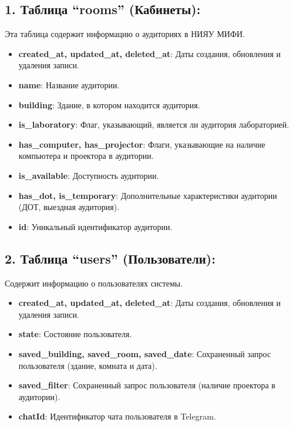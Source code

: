 \subsection*{1. Таблица ``rooms'' (Кабинеты):}
Эта таблица содержит информацию о аудиториях в НИЯУ МИФИ.
\begin{itemize}
    \item \textbf{created\_at, updated\_at, deleted\_at}: Даты создания,
обновления и удаления записи.
    \item \textbf{name}: Название аудитории.
    \item \textbf{building}: Здание, в котором находится аудитория.
    \item \textbf{is\_laboratory}: Флаг, указывающий, является ли аудитория
лабораторией.
    \item \textbf{has\_computer, has\_projector}: Флаги, указывающие на наличие
компьютера и проектора в аудитории.
    \item \textbf{is\_available}: Доступность аудитории.
    \item \textbf{has\_dot, is\_temporary}: Дополнительные характеристики
аудитории (ДОТ, выездная аудитория).
    \item \textbf{id}: Уникальный идентификатор аудитории.
\end{itemize}

\subsection*{2. Таблица ``users'' (Пользователи):}
Содержит информацию о пользователях системы.
\begin{itemize}
    \item \textbf{created\_at, updated\_at, deleted\_at}: Даты создания,
обновления и удаления записи.
    \item \textbf{state}: Состояние пользователя.
    \item \textbf{saved\_building, saved\_room, saved\_date}: Сохраненный запрос
пользователя (здание, комната и дата).
    \item \textbf{saved\_filter}: Сохраненный запрос пользователя (наличие
проектора в аудитории).
    \item \textbf{chatId}: Идентификатор чата пользователя в Telegram.
\end{itemize}

